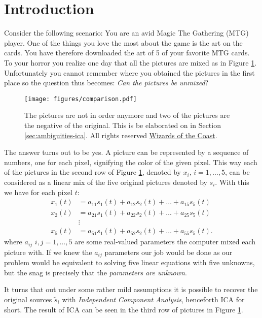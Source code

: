 
\section{Introduction}

Consider the following scenario: You are an avid Magic The Gathering (MTG) player. One of the things you love the most about the game is the art on the cards. You have therefore downloaded the art of 5 of your favorite MTG cards. To your horror you realize one day that all the pictures are mixed as in Figure \ref{fig:toy-example}. Unfortunately you cannot remember where you obtained the pictures in the first place so the question thus becomes: \textit{Can the pictures be unmixed}?

\begin{figure}
	\centering
		\texttt{[image: figures/comparison.pdf]}
	\caption{The pictures are not in order anymore and two of the pictures are the negative of the original. This is be elaborated on in Section \ref{sec:ambiguities-ica}. All rights reserved \href{https://magic.wizards.com/en}{Wizards of the Coast}.}
	\label{fig:toy-example}
\end{figure}

The answer turns out to be yes. A picture can be represented by a sequence of numbers, one for each pixel, signifying the color of the given pixel. This way each of the pictures in the second row of Figure \ref{fig:toy-example}, denoted by $x_i$, $i=1,\ldots, 5$, can be considered as a linear mix of the five original pictures denoted by $s_i$. With this we have for each pixel $t$:
	\begin{align*}
		x_1(t)&=a_{11}s_1(t)+a_{12}s_2(t)+\ldots+a_{15}s_5(t)\\
		x_2(t)&=a_{21}s_1(t)+a_{22}s_2(t)+\ldots+a_{25}s_5(t)\\
		&\vdots \\
		x_5(t)&=a_{51}s_1(t)+a_{52}s_2(t)+\ldots+a_{55}s_5(t).
	\end{align*} 
where $a_{ij}$ $i,j=1,\ldots, 5$ are some real-valued parameters the computer mixed each picture with. If we knew the $a_{ij}$ parameters our job would be done as our problem would be equivalent to solving five linear equations with five unknowns, but the snag is precisely that the \textit{parameters are unknown}. 

It turns that out under some rather mild assumptions it is possible to recover the original sources $\widetilde{s}_i$ with \textit{Independent Component Analysis}, henceforth ICA for short. The result of ICA can be seen in the third row of pictures in Figure \ref{fig:toy-example}.

